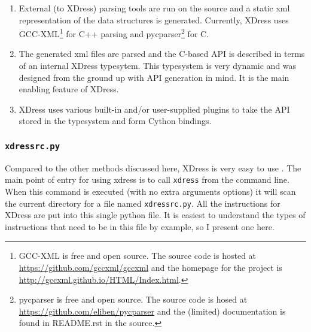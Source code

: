   \begin{enumerate}
    \item External (to XDress) parsing tools are run on the source and a static xml representation of the data structures is generated. Currently, XDress uses GCC-XML\footnote{GCC-XML is free and open source. The source code is hosted at \url{https://github.com/gccxml/gccxml} and the homepage for the project is \url{http://gccxml.github.io/HTML/Index.html}.} for C++ parsing and pycparser\footnote{pycparser is free and open source. The source code is hosed at \url{https://github.com/eliben/pycparser} and the (limited) documentation is found in README.rst in the source.} for C.
    \item The generated xml files are parsed and the C-based API is described in terms of an internal XDress typesytem. This typesystem is very dynamic and was designed from the ground up with API generation in mind. It is the main enabling feature of XDress.
    \item XDress uses various built-in and/or user-supplied plugins to take the API stored in the typesystem and form Cython bindings.
  \end{enumerate}
  \mainstretch{}

  \subsubsection{\texttt{xdressrc.py}} \label{ssub:xdressrc}


    Compared to the other methods discussed here, XDress is very easy to use . The main point of entry for using xdress is to call \texttt{xdress} from the command line. When this command is executed (with no extra arguments options) it will scan the current directory for a file named \texttt{xdressrc.py}. All the instructions for XDress are put into this single python file. It is easiest to understand the types of instructions that need to be in this file by example, so I present one here.

    \vspace{.2in}
    

